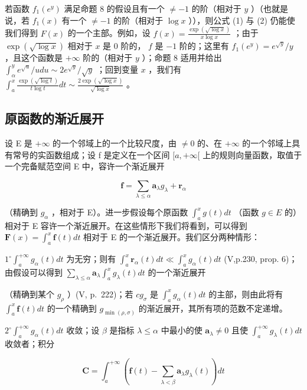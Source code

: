 若函数 \(f_{1}(e^{y})\) 满足命题 8 的假设且有一个 \(\neq -1\) 的阶（相对于 \(y\) ）（也就是说，若 \(f_{1}(x)\) 有一个 \(\neq -1\) 的阶（相对于 \(\log x\) ）），则公式 (1) 与 (2) 仍能使我们得到 \(F(x)\) 的一个主部。例如，设 \(f(x) = \frac{\exp(\sqrt{\log x})}{x\log x}\) ；由于 \(\exp(\sqrt{\log x})\) 相对于 \(x\) 是 0 阶的， \(f\) 是 \(-1\) 阶的；这里有 \(f_{1}(e^{y}) = e^{\sqrt{y}} / y\) ，且这个函数是 \(+\infty\) 阶的（相对于 \(y\) ）；命题 8 适用并给出 \(\int_{\alpha}^{y} e^{\sqrt{u}} / u du \sim 2e^{\sqrt{y}} / \sqrt{y}\) ；回到变量 \(x\) ，我们有 \(\int_{a}^{x} \frac{\exp(\sqrt{\log t})}{t\log t} dt \sim \frac{2\exp(\sqrt{\log x})}{\sqrt{\log x}}\) 。

\subsection{原函数的渐近展开}

设 E 是 \(+\infty\) 的一个邻域上的一个比较尺度，由 \(\neq 0\) 的、在 \(+\infty\) 的一个邻域上具有常号的实函数组成；设 f 是定义在一个区间 \([a, +\infty[\) 上的规则向量函数，取值于一个完备赋范空间 E 中，容许一个渐近展开

\[
\mathbf {f} = \sum_ {\lambda \leqslant \alpha} \mathbf {a} _ {\lambda} g _ {\lambda} + \mathbf {r} _ {\alpha}
\]

（精确到 \(g_{\alpha}\) ，相对于 E）。进一步假设每个原函数 \(\int_{a}^{x} g(t) dt\) （函数 \(g \in E\) 的）相对于 E 容许一个渐近展开。在这些情形下我们将看到，可以得到 \(\mathbf{F}(x) = \int_{a}^{x} \mathbf{f}(t) dt\) 相对于 E 的一个渐近展开。我们区分两种情形：

\(1^{\circ}\int_{a}^{+\infty}g_{\alpha}(t)dt\) 为无穷；则有 \(\int_{a}^{x}\mathbf{r}_{\alpha}(t)dt\ll \int_{a}^{x}g_{\alpha}(t)dt\) (V,p.230, prop. 6)；由假设可以得到 \(\sum_{\lambda \leqslant \alpha}\mathbf{a}_{\lambda}\int_{a}^{x}g_{\lambda}(t)dt\) 的一个渐近展开

（精确到某个 \(g_{\rho}\) ）(V, p.~222)；若 \(cg_{\sigma}\) 是 \(\int_{a}^{x} g_{\alpha}(t) dt\) 的主部，则由此将有 \(\int_{a}^{x} \mathbf{f}(t) dt\) 的一个精确到 \(g_{\min(\rho, \sigma)}\) 的渐近展开，其所有项的范数不定递增。

\(2^{\circ}\int_{a}^{+\infty}g_{\alpha}(t)dt\) 收敛；设 \(\beta\) 是指标 \(\lambda \leqslant \alpha\) 中最小的使 \(\mathbf{a}_{\lambda}\neq 0\) 且使 \(\int_{a}^{+\infty}g_{\lambda}(t)dt\) 收敛者；积分

\[
\mathbf {C} = \int_ {a} ^ {+ \infty} \left(\mathbf {f} (t) - \sum_ {\lambda <   \beta} \mathbf {a} _ {\lambda} g _ {\lambda} (t)\right) d t
\]

